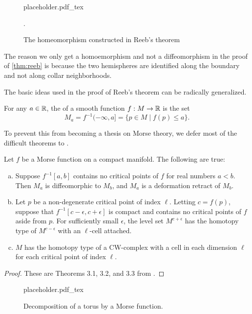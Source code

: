 \begin{figure}[ht]
	{placeholder.pdf_tex}
	\caption{The homeomorphism constructed in Reeb's theorem}.
\end{figure}

\begin{remark}
	The reason we only get a homoemorphism and not a diffeomorphism in the proof of \cref{thm:reeb} is because the two hemispheres are identified along the boundary and not along collar neighborhoods.
\end{remark}

The basic ideas used in the proof of Reeb's theorem can be radically generalized.

\begin{definition}
	For any $a\in \mathbb{R}$, the  of a smooth function $f : M \to \mathbb{R}$ is the set
	\begin{equation}
		M_a = f^{-1}(-\infty, a] = \{ p\in M \mid f(p)\leq a\}.
	\end{equation}
\end{definition}

To prevent this from becoming a thesis on Morse theory, we defer most of the difficult theorems to \cite{milnor1963morse}.

\begin{theorem}
	Let $f$ be a Morse function on a compact manifold. The following are true:
	\begin{enumerate}[(a)]
		\item Suppose $f^{-1}[a,b]$ contains no critical points of $f$ for real numbers $a<b$. Then $M_a$ is diffeomorphic to $M_b$, and $M_a$ is a deformation retract of $M_b$.
		\item Let $p$ be a non-degenerate critical point of index $\ell$. Letting $c=f(p)$, suppose that $f^{-1}[c-\epsilon, c+\epsilon]$ is compact and contains no critical points of $f$ aside from $p$. For sufficiently small $\epsilon$, the level set $M^{c+\epsilon}$ has the homotopy type of $M^{c-\epsilon}$ with an $\ell$-cell attached.
		\item $M$ has the homotopy type of a CW-complex with a cell in each dimension $\ell$ for each critical point of index $\ell$.
	\end{enumerate}
\end{theorem}
\begin{proof}
	These are Theorems 3.1, 3.2, and 3.3 from \cite{milnor1963morse}.
\end{proof}

\begin{figure}[ht]
	{placeholder.pdf_tex}
	\caption{Decomposition of a torus by a Morse function.}
\end{figure}

